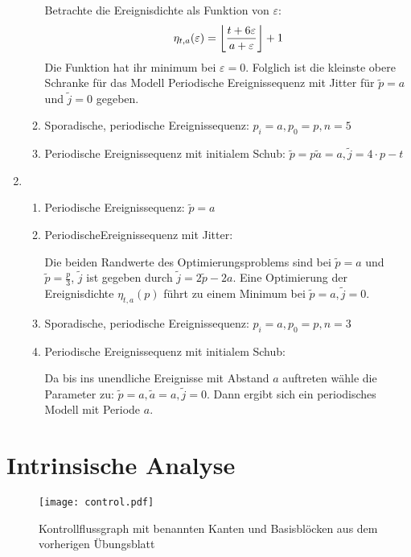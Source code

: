 \documentclass[DIN, pagenumber=false, fontsize=11pt, parskip=half]{scrartcl}
\DeclarePairedDelimiter\floor{\lfloor}{\rfloor}
\begin{document}
\begin{enumerate}[label=\roman*)]
\begin{enumerate}[label=\alph*)]
                    Betrachte die Ereignisdichte als Funktion von $\varepsilon$:
                    \begin{equation}
                        \eta_{t,a}(\varepsilon) 
                            = \floor*{\frac{t+6 \varepsilon}{a+\varepsilon}}+1
                    \end{equation}
                    Die Funktion hat ihr minimum bei $\varepsilon=0$. Folglich
                    ist die kleinste obere Schranke für das Modell
                    Periodische Ereignissequenz mit Jitter für $\tilde{p}=a$ und $\tilde{j}=0$ gegeben.
                \item Sporadische, periodische Ereignissequenz: $p_i=a, p_0=p, n=5$
                \item Periodische Ereignissequenz mit initialem Schub: 
                    $\tilde{p}=p \tilde{a}=a, \tilde{j}=4\cdot p - t$
            \end{enumerate}
        \item
            \begin{enumerate}[label=\alph*)]
                \item Periodische Ereignissequenz: $\tilde{p}=a$
                \item PeriodischeEreignissequenz mit Jitter: 

                    Die beiden Randwerte des Optimierungsproblems sind bei
                    $\tilde{p}=a$ und $\tilde{p}=\frac{p}{3}$, $\tilde{j}$ ist gegeben
                    durch $\tilde{j} = 2 \tilde{p} - 2 a$. Eine Optimierung der
                    Ereignisdichte $\eta_{t,a}(p)$ führt zu einem Minimum bei
                    $\tilde{p}=a, \tilde{j}=0$.
                \item Sporadische, periodische Ereignissequenz: $p_i=a, p_0=p, n=3$
                \item Periodische Ereignissequenz mit initialem Schub: 

                    Da bis ins unendliche Ereignisse mit Abstand $a$ auftreten wähle
                    die Parameter zu: $\tilde{p}=a, \tilde{a}=a, \tilde{j}=0$. Dann ergibt
                    sich ein periodisches Modell mit Periode $a$.
            \end{enumerate} 
    \end{enumerate}

    \section{Intrinsische Analyse}
    \begin{figure}[h]
        \centering
        \texttt{[image: control.pdf]}
        \caption{Kontrollflussgraph mit benannten Kanten und Basisblöcken
                aus dem vorherigen Übungsblatt}
    \end{figure}
\end{document}
